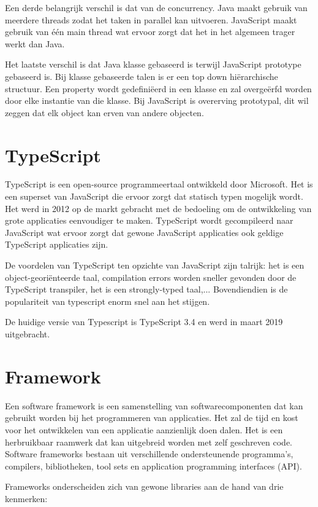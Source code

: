  Een derde belangrijk verschil is dat van de concurrency. Java maakt gebruik van meerdere threads zodat het taken in parallel kan uitvoeren. JavaScript maakt gebruik van één main thread wat ervoor zorgt dat het in het algemeen trager werkt dan Java.
 
 Het laatste verschil is dat Java klasse gebaseerd is terwijl JavaScript prototype gebaseerd is. Bij klasse gebaseerde talen is er een top down hiërarchische structuur. 
 Een property  wordt gedefiniëerd in een klasse en zal overgeërfd worden door elke instantie van die klasse. Bij JavaScript is overerving prototypal, dit wil zeggen dat elk object kan erven van andere objecten.   
 
 \section{TypeScript}
 TypeScript is een open-source programmeertaal ontwikkeld door Microsoft. Het is een superset van JavaScript die ervoor zorgt dat statisch typen mogelijk wordt. Het werd in 2012 op de markt gebracht met de bedoeling om de ontwikkeling van grote applicaties eenvoudiger te maken. TypeScript wordt gecompileerd naar JavaScript wat ervoor zorgt dat gewone JavaScript applicaties ook geldige TypeScript applicaties zijn. 
 
 De voordelen van TypeScript ten opzichte van JavaScript zijn talrijk: het is een object-georiënteerde taal, compilation errors worden sneller gevonden door de TypeScript transpiler, het is een strongly-typed taal,... Bovendiendien is de populariteit van typescript enorm snel aan het stijgen. 
 
 De huidige versie van Typescript is TypeScript 3.4 en werd in maart 2019 uitgebracht.

\section{Framework}

Een software framework is een samenstelling van softwarecomponenten dat kan gebruikt worden bij het programmeren van applicaties. Het zal de tijd en kost voor het ontwikkelen van een applicatie aanzienlijk doen dalen. 
Het is een herbruikbaar raamwerk dat kan uitgebreid worden met zelf geschreven code. Software frameworks bestaan uit verschillende ondersteunende programma's, compilers, bibliotheken, tool sets en application programming interfaces (API).

Frameworks onderscheiden zich van gewone libraries aan de hand van drie kenmerken:

